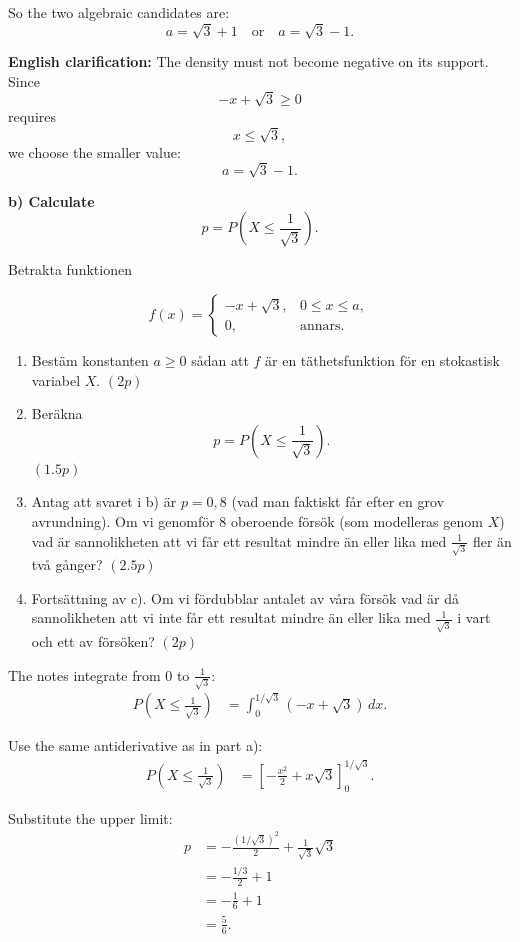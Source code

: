 \documentclass[10pt]{article}
\begin{document}
So the two algebraic candidates are:
\[
a=\sqrt{3}+1
\quad\text{or}\quad
a=\sqrt{3}-1.
\]

\textbf{English clarification:}
The density must not become negative on its support.
Since
\[
-x+\sqrt{3}\ge 0
\]
requires
\[
x\le \sqrt{3},
\]
we choose the smaller value:
\[
a=\sqrt{3}-1.
\]

\textbf{b) Calculate}
\[
p=P\left(X\le \frac{1}{\sqrt{3}}\right).
\]

Betrakta funktionen

\[
f(x)=
\begin{cases}
-x+\sqrt{3},
& 0\le x\le a,\\
0,
& \text{annars}.
\end{cases}
\]

\begin{enumerate}[label=\alph*)]
\item Bestäm konstanten \(a\ge 0\) sådan att
\(f\) är en täthetsfunktion för en stokastisk
variabel \(X\). \((2p)\)

\item Beräkna
\[
p=P\left(X\le \frac{1}{\sqrt{3}}\right).
\]
\((1.5p)\)

\item Antag att svaret i b) är \(p=0,8\)
(vad man faktiskt får efter en grov avrundning).
Om vi genomför 8 oberoende försök
(som modelleras genom \(X\)) vad är sannolikheten
att vi får ett resultat mindre än eller lika med
\(\frac{1}{\sqrt{3}}\) fler än två gånger?
\((2.5p)\)

\item Fortsättning av c). Om vi fördubblar antalet
av våra försök vad är då sannolikheten att vi inte
får ett resultat mindre än eller lika med
\(\frac{1}{\sqrt{3}}\) i vart och ett av försöken?
\((2p)\)
\end{enumerate}

The notes integrate from \(0\) to
\(\frac{1}{\sqrt{3}}\):
\begin{align*}
P\left(X\le \frac{1}{\sqrt{3}}\right)
&=
\int_0^{1/\sqrt{3}}
(-x+\sqrt{3})\,dx.
\end{align*}

Use the same antiderivative as in part a):
\begin{align*}
P\left(X\le \frac{1}{\sqrt{3}}\right)
&=
\left[
-\frac{x^2}{2}
+x\sqrt{3}
\right]_0^{1/\sqrt{3}}.
\end{align*}

Substitute the upper limit:
\begin{align*}
p
&=
-
\frac{(1/\sqrt{3})^2}{2}
+
\frac{1}{\sqrt{3}}\sqrt{3}
\\[2mm]
&=
-
\frac{1/3}{2}
+1
\\[2mm]
&=
-\frac{1}{6}
+1
\\[2mm]
&=
\frac{5}{6}.
\end{align*}
\end{document}
